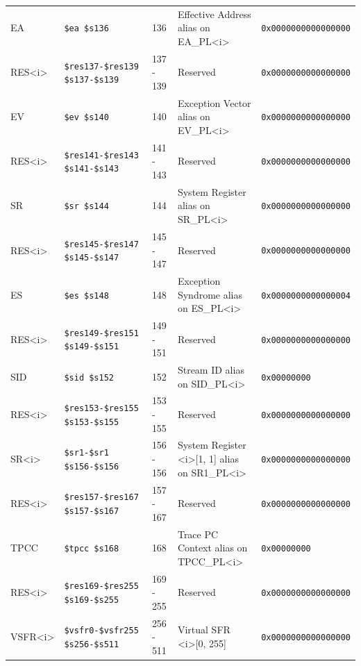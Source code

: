 {\begin{tabular}{|l|l|l|l|l|}
EA & \verb|$ea $s136| & 136 & Effective Address alias on EA\_PL\textless i\textgreater & \verb|0x0000000000000000| \\
RES\textless i\textgreater & \verb|$res137-$res139 $s137-$s139| & 137 - 139 & Reserved & \verb|0x0000000000000000| \\
EV & \verb|$ev $s140| & 140 & Exception Vector alias on EV\_PL\textless i\textgreater & \verb|0x0000000000000000| \\
RES\textless i\textgreater & \verb|$res141-$res143 $s141-$s143| & 141 - 143 & Reserved & \verb|0x0000000000000000| \\
SR & \verb|$sr $s144| & 144 & System Register alias on SR\_PL\textless i\textgreater & \verb|0x0000000000000000| \\
RES\textless i\textgreater & \verb|$res145-$res147 $s145-$s147| & 145 - 147 & Reserved & \verb|0x0000000000000000| \\
ES & \verb|$es $s148| & 148 & Exception Syndrome alias on ES\_PL\textless i\textgreater & \verb|0x0000000000000004| \\
RES\textless i\textgreater & \verb|$res149-$res151 $s149-$s151| & 149 - 151 & Reserved & \verb|0x0000000000000000| \\
SID & \verb|$sid $s152| & 152 & Stream ID alias on SID\_PL\textless i\textgreater & \verb|0x00000000| \\
RES\textless i\textgreater & \verb|$res153-$res155 $s153-$s155| & 153 - 155 & Reserved & \verb|0x0000000000000000| \\
SR\textless i\textgreater & \verb|$sr1-$sr1 $s156-$s156| & 156 - 156 & System Register \textless i\textgreater [1, 1] alias on SR1\_PL\textless i\textgreater & \verb|0x0000000000000000| \\
RES\textless i\textgreater & \verb|$res157-$res167 $s157-$s167| & 157 - 167 & Reserved & \verb|0x0000000000000000| \\
TPCC & \verb|$tpcc $s168| & 168 & Trace PC Context alias on TPCC\_PL\textless i\textgreater & \verb|0x00000000| \\
RES\textless i\textgreater & \verb|$res169-$res255 $s169-$s255| & 169 - 255 & Reserved & \verb|0x0000000000000000| \\
VSFR\textless i\textgreater & \verb|$vsfr0-$vsfr255 $s256-$s511| & 256 - 511 & Virtual SFR \textless i\textgreater [0, 255] & \verb|0x0000000000000000| \\
\hline \end{tabular}
}
